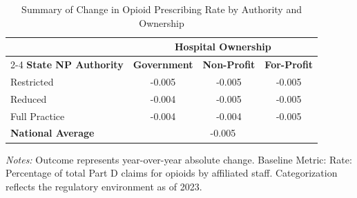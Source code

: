 \begin{table}[htbp]
    \centering
    \caption{Summary of Change in Opioid Prescribing Rate by Authority and Ownership}
    \label{tab:d_partd_opioid_rate_own}
    \vspace{0.2cm}
    \begin{tabular}{lccc}
        \toprule
        & \multicolumn{3}{c}{\textbf{Hospital Ownership}} \\
        \cmidrule(lr){2-4}
        \textbf{State NP Authority} & \textbf{Government} & \textbf{Non-Profit} & \textbf{For-Profit} \\
        \midrule
        Restricted & -0.005 & -0.005 & -0.005 \\
        Reduced & -0.004 & -0.005 & -0.005 \\
        Full Practice & -0.004 & -0.004 & -0.005 \\
        \midrule
        \textbf{National Average} & \multicolumn{3}{c}{-0.005} \\
        \bottomrule
    \end{tabular}
    \vspace{0.1cm}
    \begin{minipage}{0.85\textwidth}
        \footnotesize \textit{Notes:} Outcome represents year-over-year absolute change. Baseline Metric: Rate: Percentage of total Part D claims for opioids by affiliated staff. Categorization reflects the regulatory environment as of 2023.
    \end{minipage}
\end{table}